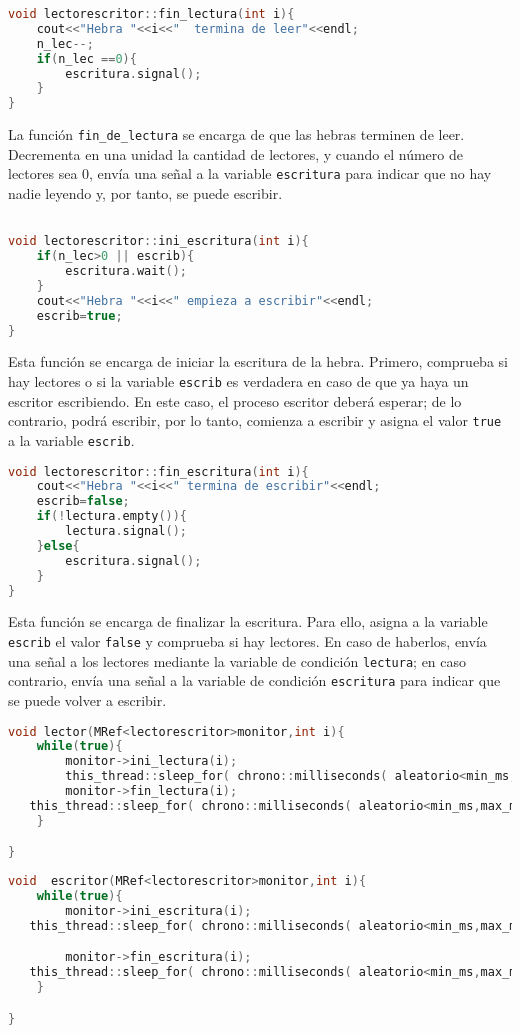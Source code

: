\documentclass{article}
\begin{document}
\begin{lstlisting}[language=C++,caption=función fin de lectura] 
void lectorescritor::fin_lectura(int i){
	cout<<"Hebra "<<i<<"  termina de leer"<<endl;
	n_lec--;
	if(n_lec ==0){
		escritura.signal();
	}
}
\end{lstlisting}
La función \texttt{fin\_de\_lectura} se encarga de que las hebras terminen de leer. Decrementa en una unidad la cantidad de lectores, y cuando el número de lectores sea 0, envía una señal a la variable \texttt{escritura} para indicar que no hay nadie leyendo y, por tanto, se puede escribir.


\begin{lstlisting}[language=C++,caption=función inicio de escritura ] 

void lectorescritor::ini_escritura(int i){
	if(n_lec>0 || escrib){
		escritura.wait();
	}
	cout<<"Hebra "<<i<<" empieza a escribir"<<endl;
	escrib=true;
}
\end{lstlisting}
Esta función se encarga de iniciar la escritura de la hebra. Primero, comprueba si hay lectores o si la variable \texttt{escrib} es verdadera en caso de que ya haya un escritor escribiendo. En este caso, el proceso escritor deberá esperar; de lo contrario, podrá escribir, por lo tanto, comienza a escribir y asigna el valor \texttt{true} a la variable \texttt{escrib}.


\begin{lstlisting}[language=C++,caption=función fin de escritura ] 
void lectorescritor::fin_escritura(int i){
	cout<<"Hebra "<<i<<" termina de escribir"<<endl;
	escrib=false;
	if(!lectura.empty()){
		lectura.signal();
	}else{
		escritura.signal();
	}
}
\end{lstlisting}
Esta función se encarga de finalizar la escritura. Para ello, asigna a la variable \texttt{escrib} el valor \texttt{false} y comprueba si hay lectores. En caso de haberlos, envía una señal a los lectores mediante la variable de condición \texttt{lectura}; en caso contrario, envía una señal a la variable de condición \texttt{escritura} para indicar que se puede volver a escribir.
\begin{lstlisting}[language=C++,caption=función lector] 
void lector(MRef<lectorescritor>monitor,int i){
	while(true){
		monitor->ini_lectura(i);
   		this_thread::sleep_for( chrono::milliseconds( aleatorio<min_ms,max_ms>() ));
		monitor->fin_lectura(i);
   this_thread::sleep_for( chrono::milliseconds( aleatorio<min_ms,max_ms>() ));
	}

}
\end{lstlisting}
\begin{lstlisting}[language=C++,caption=función escritor] 
void  escritor(MRef<lectorescritor>monitor,int i){
	while(true){
		monitor->ini_escritura(i);
   this_thread::sleep_for( chrono::milliseconds( aleatorio<min_ms,max_ms>() ));

		monitor->fin_escritura(i);
   this_thread::sleep_for( chrono::milliseconds( aleatorio<min_ms,max_ms>() ));
	}

}
\end{lstlisting}
\end{document}
